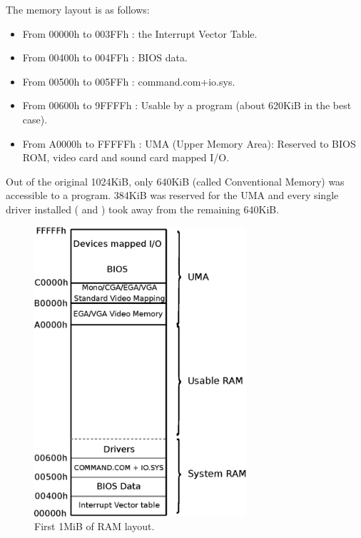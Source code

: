 \documentclass[book.tex]{subfiles}
\begin{document}
  \pagebreak
The memory layout is as follows:
\begin{itemize}
\item From 00000h to 003FFh : the Interrupt Vector Table.
\item From 00400h to 004FFh : BIOS data.
\item From 00500h to 005FFh : command.com+io.sys.
\item From 00600h to 9FFFFh : Usable by a program (about 620KiB in the best case). 
\item From A0000h to FFFFFh : UMA (Upper Memory Area): Reserved to BIOS ROM, video card and sound card mapped I/O.
\end{itemize}


\bigskip
Out of the original 1024KiB, only 640KiB (called Conventional Memory) was accessible to a program. 384KiB was reserved for the UMA and every single driver installed ( and ) took away from the remaining 640KiB.

\par
\begin{figure}
\centering
\includegraphics[width=0.7\textwidth]{imgs/drawings/real_mode_v2.eps}
\caption{First 1MiB of RAM layout.}
\label{fig:fp_internals}
\end{figure}
\pagebreak
\end{document}
